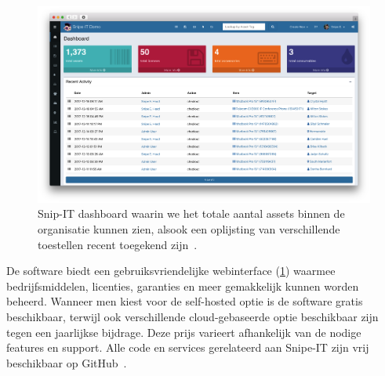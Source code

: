 \begin{figure}[h!]
    \includegraphics[width=\textwidth]
    {./graphics/snipe-dashboard.png}
    \caption{\label{fig:snipe-it-dashboard}Snip-IT dashboard waarin we het totale aantal assets binnen de organisatie kunnen zien, alsook een oplijsting van verschillende toestellen recent toegekend zijn~\autocite{snipe-it-dashboard}.}
\end{figure}

De software biedt een gebruiksvriendelijke webinterface (\ref{fig:snipe-it-dashboard}) waarmee bedrijfsmiddelen, licenties, garanties en meer gemakkelijk kunnen worden beheerd.
Wanneer men kiest voor de self-hosted optie is de software gratis beschikbaar, terwijl ook verschillende cloud-gebaseerde optie beschikbaar zijn tegen een jaarlijkse bijdrage.
Deze prijs varieert afhankelijk van de nodige features en support.
Alle code en services gerelateerd aan Snipe-IT zijn vrij beschikbaar op GitHub~\autocite{snipe-it-github}.


